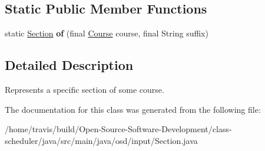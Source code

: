 \subsection*{Static Public Member Functions}
\begin{DoxyCompactItemize}
\item 
\hypertarget{interfaceosd_1_1input_1_1_section_a0f5625c7ae101d06636557b7e6a14e2a}{static \hyperlink{interfaceosd_1_1input_1_1_section}{Section} {\bfseries of} (final \hyperlink{interfaceosd_1_1input_1_1_course}{Course} course, final String suffix)}\label{interfaceosd_1_1input_1_1_section_a0f5625c7ae101d06636557b7e6a14e2a}

\end{DoxyCompactItemize}


\subsection{Detailed Description}
Represents a specific section of some course. 

The documentation for this class was generated from the following file\-:\begin{DoxyCompactItemize}
\item 
/home/travis/build/\-Open-\/\-Source-\/\-Software-\/\-Development/class-\/scheduler/java/src/main/java/osd/input/Section.\-java\end{DoxyCompactItemize}
